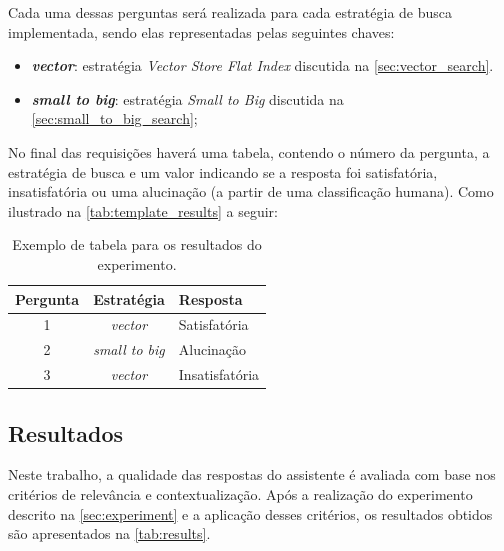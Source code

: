 \documentclass[a4paper, 12pt]{article}
\begin{document}
    Cada uma dessas perguntas será realizada para cada estratégia de busca implementada, sendo elas representadas pelas seguintes chaves:
    
    \begin{itemize}
        \item \textbf{\textit{vector}}: estratégia \textit{Vector Store Flat Index} discutida na \autoref{sec:vector_search}.
        \item \textbf{\textit{small to big}}: estratégia \textit{Small to Big} discutida na \autoref{sec:small_to_big_search};
    \end{itemize}
    
    No final das requisições haverá uma tabela, contendo o número da pergunta, a estratégia de busca e um valor indicando se a resposta foi satisfatória, insatisfatória ou uma alucinação (a partir de uma classificação humana). Como ilustrado na \autoref{tab:template_results} a seguir:

    \begin{center}
        \begin{table}[h!]
        \centering
        \renewcommand{\arraystretch}{1.5} %
        \setlength{\tabcolsep}{8pt} %
        \begin{tabular}{|c|c|l|}
        \hline
        \textbf{Pergunta} & \textbf{Estratégia} & \textbf{Resposta} \\ \hline
         1                & \textit{vector}              & Satisfatória      \\ \hline
         2                & \textit{small to big}        & Alucinação        \\ \hline
         3                & \textit{vector}              & Insatisfatória    \\ \hline
        \end{tabular}
        \caption{Exemplo de tabela para os resultados do experimento.}
        \label{tab:template_results}
        \end{table}
    \end{center}
    
    \subsection{Resultados} \label{sec:results}

    Neste trabalho, a qualidade das respostas do assistente é avaliada com base nos critérios de relevância e contextualização. Após a realização do experimento descrito na \autoref{sec:experiment} e a aplicação desses critérios, os resultados obtidos são apresentados na \autoref{tab:results}.
    
\end{document}
